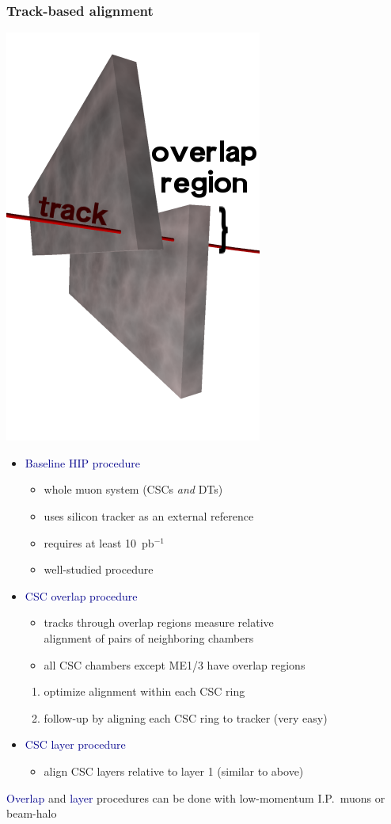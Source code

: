 \documentclass[compress]{beamer}
\begin{document}
\begin{frame}
\frametitle{Track-based alignment}

\vspace{2.2 cm}
\hfill \includegraphics[width=0.15\linewidth]{overlap.png}

\vspace{-5 cm}
\begin{itemize}\setlength{\itemsep}{0.3 cm}
\item \textcolor{darkblue}{\large Baseline HIP procedure}
\begin{itemize}
\item whole muon system (CSCs {\it and} DTs)
\item uses silicon tracker as an external reference
\item requires at least 10~pb$^{-1}$
\item well-studied procedure
\end{itemize}

\item \textcolor{darkblue}{\large CSC overlap procedure}
\begin{itemize}
\item tracks through overlap regions measure relative \\ alignment of pairs of neighboring chambers
\item all CSC chambers except ME1/3 have overlap regions
\end{itemize}

\vspace{-0.25 cm}
\begin{enumerate}
\item optimize alignment within each CSC ring
\item follow-up by aligning each CSC ring to tracker (very easy)
\end{enumerate}

\item \textcolor{darkblue}{\large CSC layer procedure}
\begin{itemize}
\item align CSC layers relative to layer 1 (similar to above)
\end{itemize}
\end{itemize}

\vspace{0.2 cm} \textcolor{darkblue}{Overlap} and \textcolor{darkblue}{layer}
procedures can be done with low-momentum I.P.\ muons or beam-halo

\end{frame}
\end{document}

